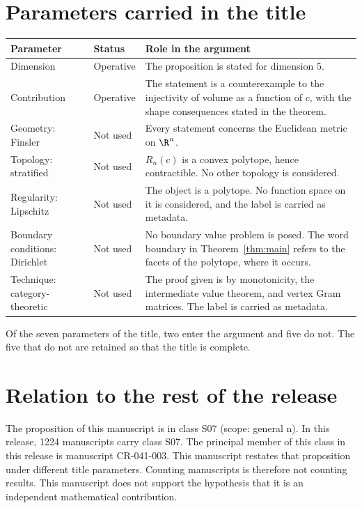 \documentclass[11pt]{article}
\begin{document}
\section{Parameters carried in the title}\label{sec:params}
\begin{center}
\small
\begin{tabular}{p{}p{}p{}}
\toprule
Parameter & Status & Role in the argument \\
\midrule
Dimension & Operative & The proposition is stated for dimension $5$. \\
Contribution & Operative & The statement is a counterexample to the injectivity of volume as a function of $c$, with the shape consequences stated in the theorem. \\
Geometry: Finsler & Not used & Every statement concerns the Euclidean metric on $\R^n$. \\
Topology: stratified & Not used & $R_n(c)$ is a convex polytope, hence contractible. No other topology is considered. \\
Regularity: Lipschitz & Not used & The object is a polytope. No function space on it is considered, and the label is carried as metadata. \\
Boundary conditions: Dirichlet & Not used & No boundary value problem is posed. The word boundary in Theorem~\ref{thm:main} refers to the facets of the polytope, where it occurs. \\
Technique: category-theoretic & Not used & The proof given is by monotonicity, the intermediate value theorem, and vertex Gram matrices. The label is carried as metadata. \\
\bottomrule
\end{tabular}
\end{center}
Of the seven parameters of the title, two enter the argument and five do not. The five that do not are retained so that the title is complete.

\section{Relation to the rest of the release}
The proposition of this manuscript is in class S07 (scope: general n).
In this release, 1224 manuscripts carry class S07. The principal member of this class in this release is manuscript CR-041-003. This manuscript restates that proposition under different title parameters.
Counting manuscripts is therefore not counting results. This manuscript does not support the hypothesis that it is an independent mathematical contribution.
\end{document}
